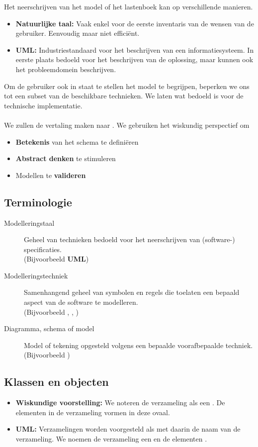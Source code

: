 \documentclass[../main.tex]{subfiles}
\begin{document}
Het neerschrijven van het model of het lastenboek kan op verschillende manieren.
\begin{itemize}
	\item \textbf{Natuurlijke taal:} Vaak enkel voor de eerste inventaris van de wensen van de gebruiker. Eenvoudig maar niet effici\"ent.
	\item \textbf{UML:} Industriestandaard voor het beschrijven van een informatiesysteem. In eerste plaats bedoeld voor het beschrijven van de oplossing, maar kunnen ook het probleemdomein beschrijven.
\end{itemize}
Om de gebruiker ook in staat te stellen het model te begrijpen, beperken we ons tot een subset van de beschikbare technieken. We laten wat bedoeld is voor de technische implementatie.\\
\\
We zullen de vertaling maken naar . We gebruiken het wiskundig perspectief om
\begin{itemize}
	\item \textbf{Betekenis} van het schema te defini\"eren
	\item \textbf{Abstract denken} te stimuleren
	\item Modellen te \textbf{valideren}
\end{itemize}

\subsection{Terminologie}
\begin{description}
	\item[Modelleringstaal] Geheel van technieken bedoeld voor het neerschrijven van (software-) specificaties. \\
	(Bijvoorbeeld \textbf{UML})
	\item[Modelleringstechniek] Samenhangend geheel van symbolen en regels die toelaten een bepaald aspect van de software te modelleren. \\
	(Bijvoorbeeld , , )
	\item[Diagramma, schema of model] Model of tekening opgesteld volgens een bepaalde voorafbepaalde  techniek. \\
	(Bijvoorbeeld )
\end{description}
\subsection{Klassen en objecten}
\begin{itemize}
	\item \textbf{Wiskundige voorstelling:} We noteren de verzameling als een . De elementen in de verzameling vormen  in deze ovaal.
	\item \textbf{UML:} Verzamelingen worden voorgesteld als  met daarin de naam van de verzameling. We noemen de verzameling een  en de elementen .
\end{itemize}
\end{document}
